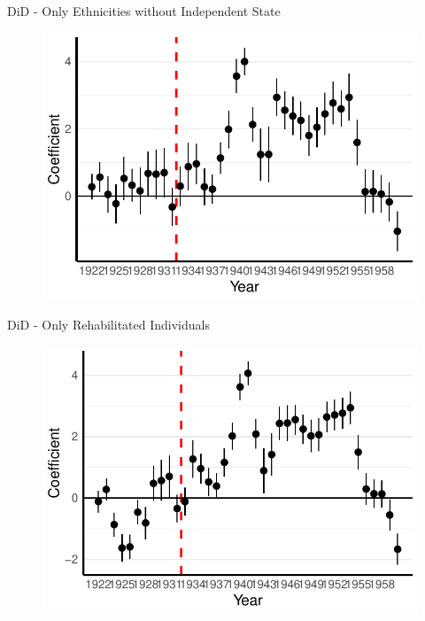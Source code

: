 \documentclass[11pt]{beamer}
\begin{document}
\begin{frame}[label=did_without_ind_state]{DiD - Only Ethnicities without Independent State}
 \begin{figure}[h]
\centering
\includegraphics[width=1\textwidth]{pr_cr2_date_imp_full_years_no_trends_not_ind_country.pdf}
\end{figure}

\hyperlink{robustness_checks}{}
\end{frame}

\begin{frame}[label=did_rehabs]{DiD - Only Rehabilitated Individuals}
 \begin{figure}[h]
\centering
\includegraphics[width=1\textwidth]{fmla_pred_full_imp_date_no_trends_geopol_rehab_cr2.pdf}
\end{figure}
\hyperlink{robustness_checks}{}
\end{frame}
\end{document}
